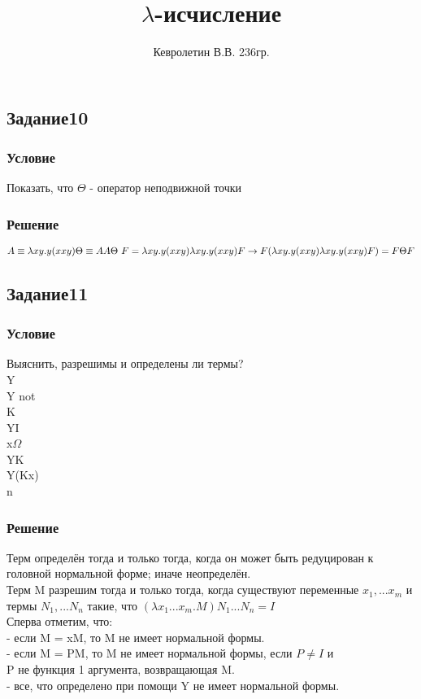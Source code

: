 \documentclass[10pt,a4paper]{article}
\author{Кевролетин В.В. 236гр.}
\title{$\lambda$-исчисление}
\begin{document}
\maketitle

\subsection*{Задание10}
\subsubsection*{Условие}
Показать, что $\Theta{}$ - оператор неподвижной точки 
\subsubsection*{Решение}

$A \equiv \lambda xy.y(xxy) \\
\Theta \equiv AA \\
\Theta \ F = \lambda xy.y(xxy)\lambda xy.y(xxy)F \rightarrow F(\lambda
xy.y(xxy)\lambda xy.y(xxy)F) = F \Theta F $

\subsection*{Задание11}
\subsubsection*{Условие}
Выяснить, разрешимы и определены ли термы? \\
Y\\
Y not\\
K\\
YI\\
x$\Omega$\\
YK\\
Y(Kx)\\
n\\
\subsubsection*{Решение}

Терм определён тогда и только тогда, когда он может быть редуцирован к
головной нормальной форме; иначе неопределён. \\
Терм M разрешим тогда и только тогда, когда существуют переменные $x_1,
... x_m $ и термы $N_1, ... N_n$ такие, что $(\lambda x_1
... x_m.M)N_1 ... N_n = I $ \\
Сперва отметим, что: \\
 - если M = xM, то M не имеет нормальной формы. \\
 - если M = PM, то M не имеет нормальной формы, если $ P \not = I $ и \\
 P не функция 1 аргумента, возвращающая M. \\
 - все, что определено при помощи Y не имеет нормальной формы.
\end{document}
